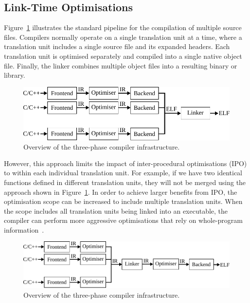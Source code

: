 \subsection{Link-Time Optimisations}

Figure~\ref{fig:full-pipeline} illustrates the standard pipeline for the compilation of multiple source files.
Compilers normally operate on a single translation unit at a time, where a translation unit includes a single source file and its expanded headers.
Each translation unit is optimised separately and compiled into a single native object file.
Finally, the linker combines multiple object files into a resulting binary or library.

\begin{figure}[h]
  \centering
  \includegraphics[scale=0.85]{src/background/figs/full-pipeline.pdf}
  \caption{Overview of the three-phase compiler infrastructure.}
  \label{fig:full-pipeline}
\end{figure}

However, this approach limits the impact of inter-procedural optimisations (IPO) to within each individual translation unit.
For example, if we have two identical functions defined in different translation units, they will not be merged using the approach shown in Figure~\ref{fig:full-pipeline}.
In order to achieve larger benefits from IPO, the optimisation scope can be increased to include multiple translation units.
When the scope includes all translation units being linked into an executable, the compiler can perform  more aggressive optimisations that rely on whole-program information~\cite{johnson17}.

\begin{figure}[h]
  \centering
  \includegraphics[scale=0.85]{src/background/figs/full-pipeline-LTO.pdf}
  \caption{Overview of the three-phase compiler infrastructure.}
  \label{fig:full-LTO-pipeline}
\end{figure}

